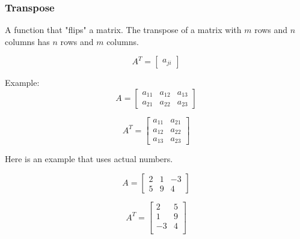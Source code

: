 \documentclass[12pt]{report}
\begin{document}
        \subsubsection{Transpose}
            A function that "flips" a matrix. The transpose of a matrix with $m$ rows and $n$ columns has $n$ rows and $m$ columns.
            
            \begin{equation}
                A^T = \begin{bmatrix}
                    a_{ji}
                \end{bmatrix}
            \end{equation}

            Example:
            \begin{equation}
                A = \begin{bmatrix}
                    a_{11} & a_{12} & a_{13} \\
                    a_{21} & a_{22} & a_{23}
                \end{bmatrix}
            \end{equation}

            \begin{equation}
                A^T = \begin{bmatrix}
                    a_{11} & a_{21} \\
                    a_{12} & a_{22} \\
                    a_{13} & a_{23}
                \end{bmatrix}
            \end{equation}

            Here is an example that uses actual numbers.

            \begin{equation}
                A = \begin{bmatrix}
                    2 & 1 & -3 \\
                    5 & 9 & 4
                \end{bmatrix}
            \end{equation}

            \begin{equation}
                A^T = \begin{bmatrix}
                    2 & 5 \\
                    1 & 9 \\
                    -3 & 4 \\
                \end{bmatrix}
            \end{equation}
\end{document}
